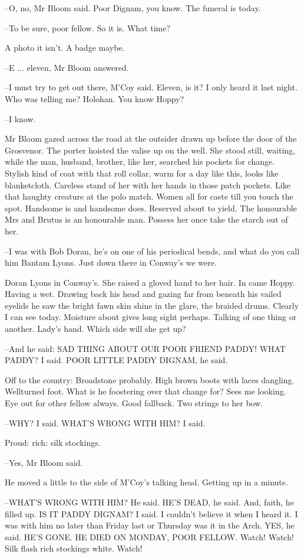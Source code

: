 --O, no, Mr Bloom said.
Poor Dignam, you know.
The funeral is today.

--To be sure, poor fellow.
So it is.
What time?

A photo it isn't.
A badge maybe.

--E ... eleven,
Mr Bloom answered.

--I must try to get out there,
M'Coy said.
Eleven, is it?
I only heard it last night.
Who was telling me?
Holohan.
You know Hoppy?

--I know.

Mr Bloom gazed across the road at the outsider drawn up before the door
of the Grosvenor. The porter hoisted the valise up on the well. She stood
still, waiting, while the man, husband, brother, like her, searched his
pockets for change. Stylish kind of coat with that roll collar, warm for
a day like this, looks like blanketcloth. Careless stand of her with her
hands in those patch pockets. Like that haughty creature at the polo
match. Women all for caste till you touch the spot. Handsome is and
handsome does. Reserved about to yield. The honourable Mrs and Brutus is
an honourable man. Possess her once take the starch out of her.

--I was with Bob Doran, he's on one of his periodical bends, and what do
you call him Bantam Lyons. Just down there in Conway's we were.

Doran Lyons in Conway's. She raised a gloved hand to her hair. In came
Hoppy. Having a wet. Drawing back his head and gazing far from beneath
his vailed eyelids he saw the bright fawn skin shine in the glare, the
braided drums. Clearly I can see today. Moisture about gives long sight
perhaps. Talking of one thing or another. Lady's hand. Which side will
she get up?

--And he said: SAD THING ABOUT OUR POOR FRIEND PADDY! WHAT PADDY? I said.
POOR LITTLE PADDY DIGNAM, he said.

Off to the country: Broadstone probably. High brown boots with laces
dangling. Wellturned foot. What is he foostering over that change for?
Sees me looking. Eye out for other fellow always. Good fallback. Two
strings to her bow.

--WHY? I said. WHAT'S WRONG WITH HIM? I said.

Proud: rich: silk stockings.

--Yes, Mr Bloom said.

He moved a little to the side of M'Coy's talking head. Getting up in a
minute.

--WHAT'S WRONG WITH HIM? He said. HE'S DEAD, he said. And, faith, he
filled up. IS IT PADDY DIGNAM? I said. I couldn't believe it when I heard
it. I was with him no later than Friday last or Thursday was it in the
Arch. YES, he said. HE'S GONE. HE DIED ON MONDAY, POOR FELLOW. Watch!
Watch! Silk flash rich stockings white. Watch!

